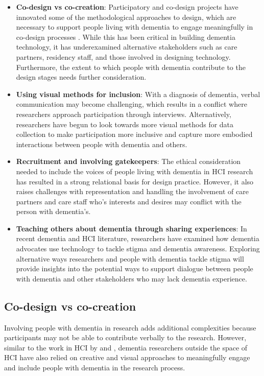 \begin{itemize}
    \item \textbf{Co-design vs co-creation}: Participatory and co-design projects have innovated some of the methodological approaches to design, which are necessary to support people living with dementia to engage meaningfully in co-design processes \citep{branco_personalised_2017}. While this has been critical in building dementia technology, it has underexamined alternative stakeholders such as care partners, residency staff, and those involved in designing technology. Furthermore, the extent to which people with dementia contribute to the design stages needs further consideration.
    
    \item \textbf{Using visual methods for inclusion}: With a diagnosis of dementia, verbal communication may become challenging, which results in a conflict where researchers approach participation through interviews. Alternatively, researchers have begun to look towards more visual methods for data collection to make participation more inclusive and capture more embodied interactions between people with dementia and others.

    \item \textbf{Recruitment and involving gatekeepers}: The ethical consideration needed to include the voices of people living with dementia in HCI research has resulted in a strong relational basis for design practice. However, it also raises challenges with representation and handling the involvement of care partners and care staff who's interests and desires may conflict with the person with dementia's. 
    
    \item \textbf{Teaching others about dementia through sharing experiences}: In recent dementia and HCI literature, researchers have examined how dementia advocates use technology to tackle stigma and dementia awareness. Exploring alternative ways researchers and people with dementia tackle stigma will provide insights into the potential ways to support dialogue between people with dementia and other stakeholders who may lack dementia experience.
\end{itemize}

\subsection{Co-design vs co-creation}
Involving people with dementia in research adds additional complexities because participants may not be able to contribute verbally to the research. However, similar to the work in HCI by \cite{lazar_using_2014} and \cite{foley_student_2020}, dementia researchers outside the space of HCI have also relied on creative and visual approaches to meaningfully engage and include people with dementia in the research process.


